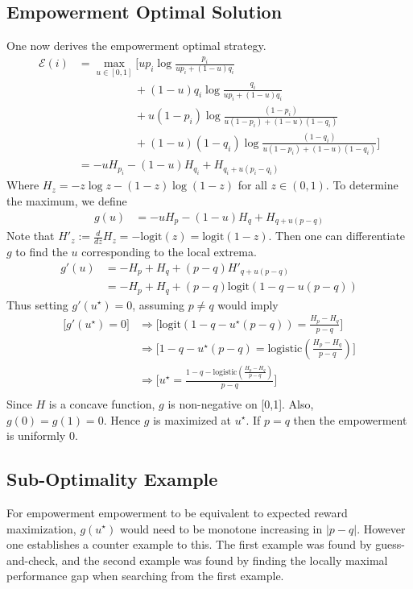 \documentclass{article}
\newcommand{\Ee}{\mathcal{E}}
\begin{document}
\subsection{Empowerment Optimal Solution}
One now derives the empowerment optimal strategy. 
\begin{align*}
\Ee(i) 
	&= \max_{u\in [0,1]}\bigg[up_i \log \frac{p_i}{up_i+(1-u)q_i}\\
	&\hspace{5em} + (1-u)q_i \log \frac{q_i}{up_i+(1-u)q_i}\\
	&\hspace{5em} + u(1-p_i) \log \frac{(1-p_i)}{u(1-p_i)+(1-u)(1-q_i)}\\
	&\hspace{5em} + (1-u)(1-q_i) \log \frac{(1-q_i)}{u(1-p_i)+(1-u)(1-q_i)}\bigg]\\
	&=-uH_{p_i}-(1-u)H_{q_i}+H_{q_i+u(p_i-q_i)}
\end{align*}
Where $H_z=-z\log z - (1-z)\log(1-z)$ for all $z\in (0,1)$. To determine the maximum, we define 
\begin{align*}
g(u)&= -uH_{p}-(1-u)H_{q}+H_{q+u(p-q)} 
\end{align*}
Note that $H'_z:=\frac{d}{dz} H_z= -\text{logit}(z)=\text{logit}(1-z)$.
Then one can differentiate $g$ to find the $u$ corresponding to the local extrema.
\begin{align*}
g'(u) 
	&= -H_p + H_q + (p-q)H'_{q+u(p-q)}\\
	&= -H_p + H_q +(p-q)\text{logit}(1-q-u(p-q))
\end{align*}
Thus setting $g'(u^\star)=0$, assuming $p\neq q$ would imply
\begin{align*}
\bigg[g'(u^\star)=0\bigg]
	&\Rightarrow\bigg[\text{logit}(1-q-u^\star(p-q)) = \frac{H_{p}-H_{q}}{p-q}\bigg]\\
	&\Rightarrow\bigg[1-q-u^\star(p-q) = \text{logistic}\left(\frac{H_{p}-H_{q}}{p-q}\right)\bigg]\\
	&\Rightarrow\bigg[u^\star=\frac{1-q-\text{logistic}\left(\frac{H_{p}-H_{q}}{p-q}\right)}{p-q} \bigg]\\
\end{align*}
Since $H$ is a concave function, $g$ is non-negative on [0,1]. Also, $g(0)=g(1)=0$. Hence $g$ is maximized at $u^\star$. If $p=q$ then the empowerment is uniformly $0$.

\subsection{Sub-Optimality Example}
For empowerment empowerment to be equivalent to expected reward maximization, $g(u^\star)$ would need to be monotone increasing in $|p-q|$. However one establishes a counter example to this. The first example was found by guess-and-check, and the second example was found by finding the locally maximal performance gap when searching from the first example. 
\end{document}
